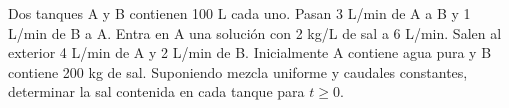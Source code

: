 Dos tanques A y B contienen 100 L cada uno. Pasan 3 L/min de A a B y 1 L/min de B a A.
Entra en A una solución con 2 kg/L de sal a 6 L/min. Salen al exterior 4 L/min de A y
2 L/min de B. Inicialmente A contiene agua pura y B contiene 200 kg de sal.
Suponiendo mezcla uniforme y caudales constantes, determinar la sal contenida en cada tanque para \(t\ge0\).
